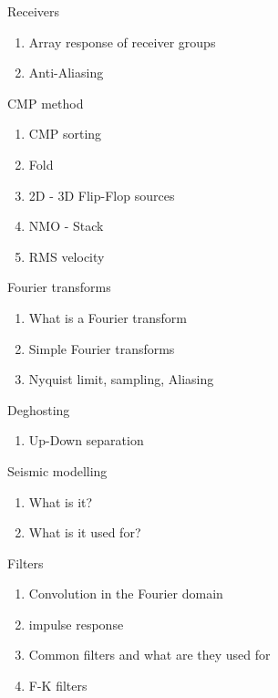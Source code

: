 \documentclass[xcolor=dvipsnames,notes]{beamer}
\begin{document}
\begin{frame}{Receivers}
\begin{enumerate}
  \item Array response of receiver groups
  \item Anti-Aliasing
\end{enumerate}
\end{frame}
\begin{frame}{CMP method}
\begin{enumerate}
  \item CMP sorting
  \item Fold
  \item 2D - 3D  Flip-Flop sources
  \item NMO - Stack
  \item RMS velocity
\end{enumerate}
\end{frame}
\begin{frame}{Fourier transforms}
\begin{enumerate}
  \item What is a Fourier transform
  \item Simple Fourier transforms
  \item Nyquist limit, sampling, Aliasing
\end{enumerate}
\end{frame}
\begin{frame}{Deghosting}
\begin{enumerate}
  \item Up-Down separation  
\end{enumerate}
\end{frame}
\begin{frame}{Seismic modelling}
\begin{enumerate}
  \item What is it?
  \item What is it used for?
\end{enumerate}
\end{frame}
\begin{frame}{Filters}
\begin{enumerate}
  \item Convolution in the Fourier domain
  \item impulse response
  \item Common filters and
        what are they used for
  \item F-K filters
\end{enumerate}
\end{frame}
\end{document}
